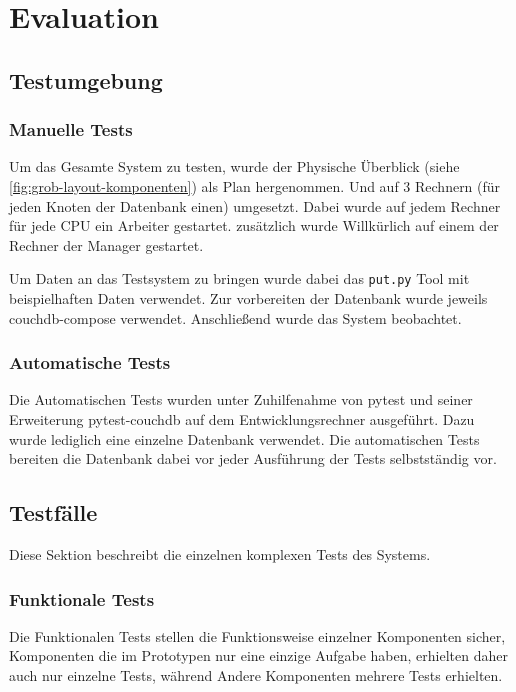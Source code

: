 \chapter{Evaluation}
\section{Testumgebung}

\subsection{Manuelle Tests}
Um das Gesamte System zu testen, wurde der Physische Überblick (siehe \cref{fig:grob-layout-komponenten}) als Plan hergenommen.
Und auf 3 Rechnern (für jeden Knoten der Datenbank einen) umgesetzt.
Dabei wurde auf jedem Rechner für jede CPU ein Arbeiter gestartet.
zusätzlich wurde Willkürlich auf einem der Rechner der Manager gestartet.

Um Daten an das Testsystem zu bringen wurde dabei das \verb|put.py| Tool mit beispielhaften Daten verwendet.
Zur vorbereiten der Datenbank wurde jeweils couchdb-compose \cite{couchdb:compose} verwendet.
Anschließend wurde das System beobachtet.

\subsection{Automatische Tests}
Die Automatischen Tests wurden unter Zuhilfenahme von pytest \cite{pytest:website} und seiner Erweiterung  pytest-couchdb \cite{pytest:couchdbkit} auf dem Entwicklungsrechner  ausgeführt.
Dazu wurde lediglich eine einzelne Datenbank verwendet.
Die automatischen Tests bereiten die Datenbank dabei vor jeder Ausführung der Tests selbstständig vor.

\section{Testfälle}

Diese Sektion beschreibt die einzelnen komplexen Tests des Systems.

\subsection{Funktionale Tests}
Die Funktionalen Tests stellen die Funktionsweise einzelner Komponenten sicher,
Komponenten die im Prototypen nur eine einzige Aufgabe haben,
erhielten daher auch nur einzelne Tests, während Andere Komponenten mehrere Tests erhielten.

